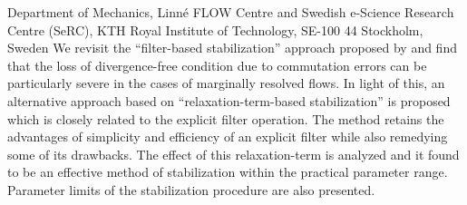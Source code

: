 %
%
%
%
%
%
%
\paperaffiliation
{%
Department of Mechanics, Linn\'e FLOW Centre and Swedish e-Science Research Centre (SeRC), KTH Royal Institute of Technology, SE-100 44 Stockholm, Sweden 
}%
%
%
%
%
%
%
%
\papersummary%
{%
	We revisit the ``filter-based stabilization'' approach proposed by \cite{fischer01} and find that the loss of divergence-free condition due to commutation errors can be particularly severe in the cases of marginally resolved flows. In light of this, an alternative approach based on ``relaxation-term-based stabilization'' is proposed which is closely related to the explicit filter operation. The method retains the advantages of simplicity and efficiency of an explicit filter while also remedying some of its drawbacks. The effect of this relaxation-term is analyzed and it found to be an effective method of stabilization within the practical parameter range. Parameter limits of the stabilization procedure are also presented.
}%
%
\graphicspath{{paper1/imgs/}}%
%
%
%
